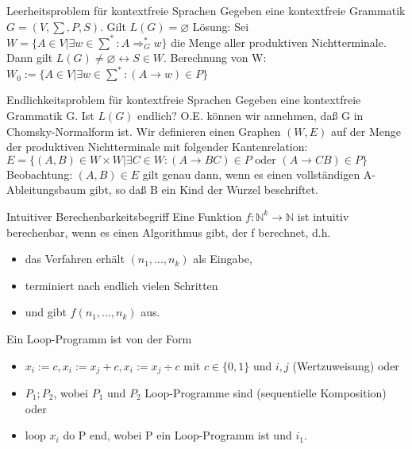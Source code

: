 \documentclass[avery5371]{flashcards}
\begin{document}
\begin{flashcard}[Definition]{ Leerheitsproblem für kontextfreie Sprachen} Gegeben eine kontextfreie Grammatik $G=(V,\sum,P,S)$. Gilt $L(G)=\varnothing$
Lösung: Sei $W=\{A\in V | \exists w\in\sum^*: A\Rightarrow_G^* w\}$ die Menge aller produktiven Nichtterminale. Dann gilt $L(G)\not= \varnothing \leftrightarrow S\in W$. Berechnung von W: 
$W_0:=\{A\in V | \exists w\in\sum^*:(A\rightarrow w)\in P\}$
\end{flashcard}

\begin{flashcard}[Definition]{ Endlichkeitsproblem für kontextfreie Sprachen} Gegeben eine kontextfreie Grammatik G. Ist $L(G)$ endlich?
O.E. können wir annehmen, daß G in Chomsky-Normalform ist. Wir definieren einen Graphen $(W , E )$ auf der Menge der produktiven Nichtterminale mit folgender Kantenrelation: $E=\{(A,B)\in W\times W | \exists C \in W: (A\rightarrow BC)\in P \text{ oder } (A\rightarrow CB)\in P\}$
Beobachtung: $(A,B)\in E$ gilt genau dann, wenn es einen vollständigen A-Ableitungsbaum gibt, so daß B ein Kind der Wurzel beschriftet.
\end{flashcard}

\begin{flashcard}[Definition]{ Intuitiver Berechenbarkeitsbegriff} Eine Funktion $f:\mathbb{N}^k\rightarrow\mathbb{N}$ ist intuitiv berechenbar, wenn es einen Algorithmus gibt, der f berechnet, d.h.\begin{itemize}
\item das Verfahren erhält $(n_1,..., n_k)$ als Eingabe,
\item terminiert nach endlich vielen Schritten
\item und gibt $f(n_1,...,n_k )$ aus.
\end{itemize}
\end{flashcard}

\begin{flashcard}[Definition]{ Ein Loop-Programm ist von der Form}\begin{itemize}
\item $x_i := c, x_i := x_j + c, x_i := x_j \div c$ mit $c\in\{0, 1\}$ und $i, j$ (Wertzuweisung) oder
\item $P_1 ; P_2$, wobei $P_1$ und $P_2$ Loop-Programme sind (sequentielle Komposition) oder
\item loop $x_i$ do P end, wobei P ein Loop-Programm ist und $i_1$.
\end{itemize}
\end{flashcard}
\end{document}
